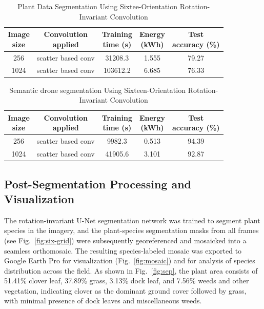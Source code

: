 \begin{table}[ht]
\centering
\caption{Plant Data Segmentation Using Sixtee-Orientation Rotation-Invariant Convolution}
\renewcommand{\arraystretch}{1.2}
\begin{tabular}{c|c|c|c|c} 
\hline\hline
\shortstack{Image\\size} & 
\shortstack{Convolution\\applied} & 
\shortstack{Training\\time (s)} &  
\shortstack{Energy\\(kWh)} &  
\shortstack{Test\\accuracy (\%)} \\ 
\hline
\hline
256
 & scatter based conv  & 31208.3  &1.555   &79.27  \\
\hline
1024
 & scatter based conv  &103612.2   &6.685    &76.33  \\
\hline
\end{tabular}
\label{tab:sixteen-plant}
\end{table}

\begin{table}[ht]
\centering
\caption{Semantic drone segmentation Using Sixteen-Orientation Rotation-Invariant Convolution}
\renewcommand{\arraystretch}{1.2}
\begin{tabular}{c|c|c|c|c} 
\hline\hline
\shortstack{Image\\size} & 
\shortstack{Convolution\\applied} & 
\shortstack{Training\\time (s)} &  
\shortstack{Energy\\(kWh)} &  
\shortstack{Test\\accuracy (\%)} \\ 
\hline\hline
256
 & scatter based conv  & 9982.3 &0.513  &94.39  \\
\hline
1024
 & scatter based conv  & 41905.6 &3.101 &92.87  \\
\hline
\end{tabular}
\label{tab:sixteen-drone}
\end{table}


\subsection{Post-Segmentation Processing and Visualization}

The rotation-invariant U-Net segmentation network was trained to segment plant species in the imagery, 
and the plant-species segmentation masks from all frames (see Fig.~\ref{fig:six-grid}) were subsequently georeferenced and mosaicked into a seamless orthomosaic.
The resulting species‑labeled mosaic was exported to Google Earth Pro for visualization (Fig.~\ref{fig:mosaic}) and for analysis of species distribution across the field. 
As shown in Fig.~\ref{fig:sep}, the plant area consists of 51.41\% clover leaf, 37.89\% grass, 3.13\% dock leaf, and 7.56\% weeds and other vegetation, 
indicating clover as the dominant ground cover followed by grass, with minimal presence of dock leaves and miscellaneous weeds.

